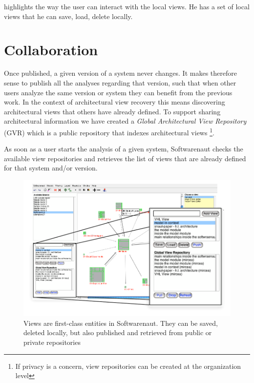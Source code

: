 \documentclass[preprint,12pt]{elsarticle}
\begin{document}
 highlights the way the user can interact with the local views. He has a set of local views that he can save, load, delete locally. 


\newpage
\section {Collaboration}
\label {sec:collab}


Once published, a given version of a system never changes. It makes therefore sense to publish all the analyses regarding that version, such that when other users analyze the same version or system they can benefit from the previous work. In the context of architectural view recovery this means discovering architectural views that others have already defined. To support sharing architectural information we have created a {\em Global Architectural View Repository} (GVR) which is a public repository that indexes architectural views \footnote{If privacy is a concern, view repositories can be created at the organization level}.

As soon as a user starts the analysis of a given system, Softwarenaut checks the available view repositories and retrieves the list of views that are already defined for that system and/or version.


\begin{figure}[h]
\begin{center}
\includegraphics[width=0.8\linewidth]{images/ViewOperations.pdf}
\caption{Views are first-class entities in Softwarenaut. They can be saved, deleted locally, but also published and retrieved from public or private repositories}
\end{center}
\end{figure}
\end{document}
